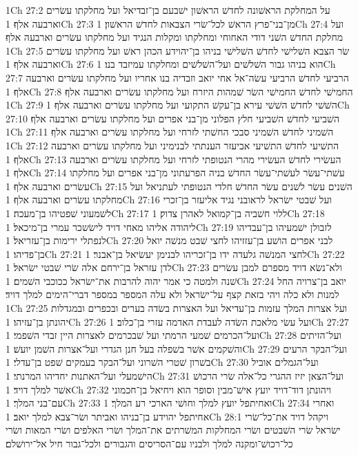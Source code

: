 1Ch 27:2  על המחלקת הראשׁונה לחדשׁ הראשׁון ישׁבעם בן־זבדיאל ועל מחלקתו עשׂרים וארבעה אלף׃
1Ch 27:3  מן־בני־פרץ הראשׁ לכל־שׂרי הצבאות לחדשׁ הראשׁון׃
1Ch 27:4  ועל מחלקת החדשׁ השׁני דודי האחוחי ומחלקתו ומקלות הנגיד ועל מחלקתו עשׂרים וארבעה אלף׃
1Ch 27:5  שׂר הצבא השׁלישׁי לחדשׁ השׁלישׁי בניהו בן־יהוידע הכהן ראשׁ ועל מחלקתו עשׂרים וארבעה אלף׃
1Ch 27:6  הוא בניהו גבור השׁלשׁים ועל־השׁלשׁים ומחלקתו עמיזבד בנו׃
1Ch 27:7  הרביעי לחדשׁ הרביעי עשׂה־אל אחי יואב וזבדיה בנו אחריו ועל מחלקתו עשׂרים וארבעה אלף׃
1Ch 27:8  החמישׁי לחדשׁ החמישׁי השׂר שׁמהות היזרח ועל מחלקתו עשׂרים וארבעה אלף׃
1Ch 27:9  השׁשׁי לחדשׁ השׁשׁי עירא בן־עקשׁ התקועי ועל מחלקתו עשׂרים וארבעה אלף׃
1Ch 27:10  השׁביעי לחדשׁ השׁביעי חלץ הפלוני מן־בני אפרים ועל מחלקתו עשׂרים וארבעה אלף׃
1Ch 27:11  השׁמיני לחדשׁ השׁמיני סבכי החשׁתי לזרחי ועל מחלקתו עשׂרים וארבעה אלף׃
1Ch 27:12  התשׁיעי לחדשׁ התשׁיעי אביעזר הענתתי לבנימיני ועל מחלקתו עשׂרים וארבעה אלף׃
1Ch 27:13  העשׂירי לחדשׁ העשׂירי מהרי הנטופתי לזרחי ועל מחלקתו עשׂרים וארבעה אלף׃
1Ch 27:14  עשׁתי־עשׂר לעשׁתי־עשׂר החדשׁ בניה הפרעתוני מן־בני אפרים ועל מחלקתו עשׂרים וארבעה אלף׃
1Ch 27:15  השׁנים עשׂר לשׁנים עשׂר החדשׁ חלדי הנטופתי לעתניאל ועל מחלקתו עשׂרים וארבעה אלף׃
1Ch 27:16  ועל שׁבטי ישׂראל לראובני נגיד אליעזר בן־זכרי לשׁמעוני שׁפטיהו בן־מעכה׃
1Ch 27:17  ללוי חשׁביה בן־קמואל לאהרן צדוק׃
1Ch 27:18  ליהודה אליהו מאחי דויד לישׂשכר עמרי בן־מיכאל׃
1Ch 27:19  לזבולן ישׁמעיהו בן־עבדיהו לנפתלי ירימות בן־עזריאל׃
1Ch 27:20  לבני אפרים הושׁע בן־עזזיהו לחצי שׁבט מנשׁה יואל בן־פדיהו׃
1Ch 27:21  לחצי המנשׁה גלעדה ידו בן־זכריהו לבנימן יעשׂיאל בן־אבנר׃
1Ch 27:22  לדן עזראל בן־ירחם אלה שׂרי שׁבטי ישׂראל׃
1Ch 27:23  ולא־נשׂא דויד מספרם למבן עשׂרים שׁנה ולמטה כי אמר יהוה להרבות את־ישׂראל ככוכבי השׁמים׃
1Ch 27:24  יואב בן־צרויה החל למנות ולא כלה ויהי בזאת קצף על־ישׂראל ולא עלה המספר במספר דברי־הימים למלך דויד׃
1Ch 27:25  ועל אצרות המלך עזמות בן־עדיאל ועל האצרות בשׂדה בערים ובכפרים ובמגדלות יהונתן בן־עזיהו׃
1Ch 27:26  ועל עשׂי מלאכת השׂדה לעבדת האדמה עזרי בן־כלוב׃
1Ch 27:27  ועל־הכרמים שׁמעי הרמתי ועל שׁבכרמים לאצרות היין זבדי השׁפמי׃
1Ch 27:28  ועל־הזיתים והשׁקמים אשׁר בשׁפלה בעל חנן הגדרי ועל־אצרות השׁמן יועשׁ׃
1Ch 27:29  ועל־הבקר הרעים בשׁרון שׁטרי השׁרוני ועל־הבקר בעמקים שׁפט בן־עדלי׃
1Ch 27:30  ועל־הגמלים אוביל הישׁמעלי ועל־האתנות יחדיהו המרנתי׃
1Ch 27:31  ועל־הצאן יזיז ההגרי כל־אלה שׂרי הרכושׁ אשׁר למלך דויד׃
1Ch 27:32  ויהונתן דוד־דויד יועץ אישׁ־מבין וסופר הוא ויחיאל בן־חכמוני עם־בני המלך׃
1Ch 27:33  ואחיתפל יועץ למלך וחושׁי הארכי רע המלך׃
1Ch 27:34  ואחרי אחיתפל יהוידע בן־בניהו ואביתר ושׂר־צבא למלך יואב׃
1Ch 28:1  ויקהל דויד את־כל־שׂרי ישׂראל שׂרי השׁבטים ושׂרי המחלקות המשׁרתים את־המלך ושׂרי האלפים ושׂרי המאות ושׂרי כל־רכושׁ־ומקנה למלך ולבניו עם־הסריסים והגבורים ולכל־גבור חיל אל־ירושׁלם׃
